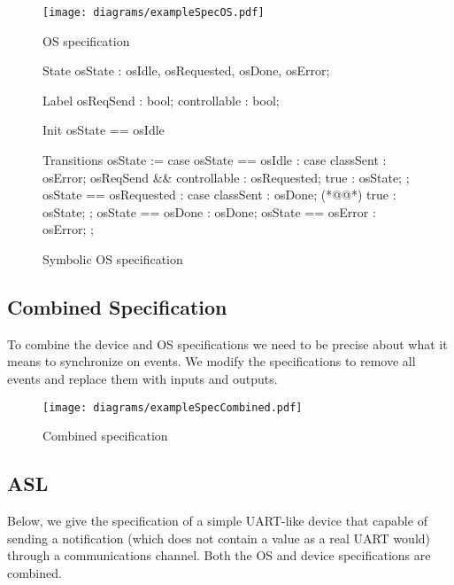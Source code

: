 \begin{figure}
\centering
\texttt{[image: diagrams/exampleSpecOS.pdf]}
\caption{OS specification}
\label{fig:os_spec}
\end{figure}

\begin{figure}
\centering
\begin{asllisting}

State
osState  : {osIdle, osRequested, osDone, osError};

Label
osReqSend    : bool;
controllable : bool;

Init
osState == osIdle 

Transitions
osState := case {
    osState == osIdle :
        case {
            classSent                 : osError;
            osReqSend && controllable : osRequested;
            true                      : osState;
        };
    osState == osRequested :
        case {
            classSent : osDone; (*@\label{fig:os_spec_asl:l:class}@*)
            true      : osState;
        };
    osState == osDone  : osDone;
    osState == osError : osError;
};

\end{asllisting}
\caption{Symbolic OS specification}
\label{fig:os_spec_asl}
\end{figure}

\subsection{Combined Specification}

To combine the device and OS specifications we need to be precise about what it means to synchronize on events. We modify the specifications to remove all events and replace them with inputs and outputs.

\begin{figure}
\centering
\texttt{[image: diagrams/exampleSpecCombined.pdf]}
\caption{Combined specification}
\label{fig:combined_spec}
\end{figure}

\subsection{ASL}

Below, we give the specification of a simple UART-like device that capable of sending a notification (which does not contain a value as a real UART would) through a communications channel. Both the OS and device specifications are combined. 

